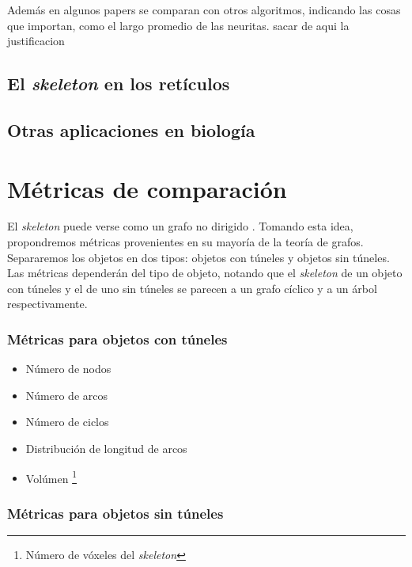 Además en algunos papers se comparan con otros algoritmos, indicando las cosas que importan, como el largo promedio de las neuritas. sacar de aqui la justificacion

\subsection{El \textit{skeleton} en los retículos}

\subsection{Otras aplicaciones en biología}



\section{Métricas de comparación}

El \textit{skeleton} puede verse como un grafo no dirigido \cite{bai2008path}. Tomando esta idea, propondremos métricas provenientes en su mayoría de la teoría de grafos. Separaremos los objetos en dos tipos: objetos con túneles \cite{svensson2003finding} y objetos sin túneles. Las métricas dependerán del tipo de objeto, notando que el \textit{skeleton} de un objeto con túneles y el de uno sin túneles se parecen a un grafo cíclico y a un árbol respectivamente.

\subsubsection{Métricas para objetos con túneles}

\begin{itemize}
\item Número de nodos
\item Número de arcos
\item Número de ciclos
\item Distribución de longitud de arcos
\item Volúmen \footnote{Número de vóxeles del \textit{skeleton}}
\end{itemize}

\subsubsection{Métricas para objetos sin túneles}


